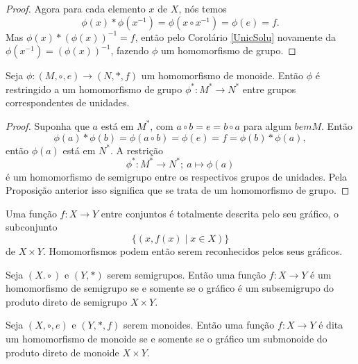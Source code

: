 \begin{definition}[Magma]
\begin{stat}
\begin{proof}
               Agora para cada elemento $x$ de $X$, nós temos $$\phi(x)*\phi(x^{-1})=\phi(x\circ x^{-1}) = \phi(e)=f.$$
               Mas $\phi(x)*(\phi(x))^{-1} = f$, então pelo Corolário \ref{UnicSolu} novamente da $\phi(x^{-1})=(\phi(x))^{-1}$, fazendo $\phi$ um homomorfismo de grupo.
            \end{proof}
         \end{stat}

         \begin{theorem}
            Seja $\phi:(M,\circ,e)\to (N,*,f)$ um homomorfismo de monoide. Então $\phi$ é restringido a um homomorfismo de grupo $\phi^{*}:M^* \to N^*$ entre grupos correspondentes de unidades.
            \begin{proof}
               Suponha que $a$ está em $M^*$, com $a\circ b = e = b\circ a$ para algum $b em M$. Então
               $$\phi(a)* \phi (b) = \phi(a \circ b) = \phi(e) = f = \phi(b) * \phi(a),$$
               então $\phi(a)$ está em $N^*$. A restrição $$\phi^{*}:M^{*}\to N^{*};\ a\mapsto \phi(a)$$
               é um homomorfismo de semigrupo entre os respectivos grupos de unidades. Pela Proposição anterior isso significa que se trata de um homomorfismo de grupo.
            \end{proof}
         \end{theorem}
         Uma função $f:X\to Y$ entre conjuntos é totalmente descrita pelo seu gráfico, o subconjunto
         $$\{(x,f(x)\mid x \in X)\}$$ de $X\times Y$. Homomorfismos podem então serem reconhecidos pelos seus gráficos.

         \begin{stat}
            Seja $(X.\circ)$ e $(Y,*)$ serem semigrupos. Então uma função $f: X\to Y$ é um homomorfismo de semigrupo se e somente se o gráfico é um subsemigrupo do produto direto de semigrupo $X\times Y$.
         \end{stat}
         \begin{corollary}
            Seja $(X,\circ, e)$ e $(Y,*,f)$ serem monoides. Então uma função $f: X \to Y$ é dita um homomorfismo de monoide se e somente se o gráfico um submonoide do produto direto de monoide $X\times Y$.
         \end{corollary}


\end{definition}
